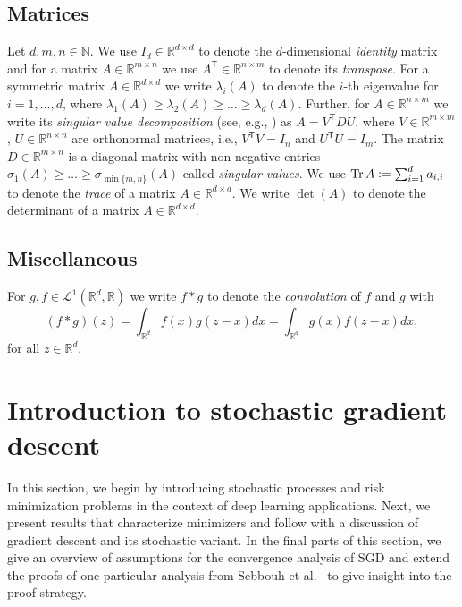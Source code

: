 \documentclass[12pt]{article}
\theoremstyle{definition}
\numberwithin{equation}{section}
\newcommand{\N}{\mathbb{N}}
\newcommand{\R}{\mathbb{R}}
\newcommand{\CL}{\mathcal{L}}
\newcommand{\T}{\mathsf{T}}
\newcommand{\defeq}{\vcentcolon=}
\DeclareMathOperator{\Tr}{Tr}
\begin{document}
\subsection{Matrices}
Let $d,m,n \in \N$. We use $I_d \in \R^{d \times d}$ to denote the $d$-dimensional \emph{identity} matrix and for a matrix $A \in \R^{m \times n}$ we use $A^\T \in \R^{n \times m}$ to denote its \emph{transpose}.
For a symmetric matrix $A \in \R^{d \times d}$ we write $\lambda_i(A)$ to denote the $i$-th eigenvalue for $i=1,\dots,d$, where $\lambda_1(A) \geq \lambda_2(A) \geq \dots \geq \lambda_d(A)$. Further, for $A \in \R^{n \times m}$ we write its \emph{singular value decomposition} (see, e.g., \cite{lycheNumericalLinearAlgebra2020}) as $A = V^\T D U$, where $V \in \R^{m \times m}$, $U \in \R^{n \times n}$ are orthonormal matrices, i.e., $V^\T V = I_n$ and $U^\T U = I_m$. The matrix $D \in \R^{m \times n}$ is a diagonal matrix with non-negative entries $\sigma_1(A) \geq \dots \geq \sigma_{\min\{m,n\}}(A)$ called \emph{singular values}. We use $\Tr A \defeq \sum_{i=1}^d a_{i,i}$ to denote the \emph{trace} of a matrix $A \in \R^{d \times d}$. We write $\det(A)$ to denote the determinant of a matrix $A \in \R^{d\times d}$.
\subsection{Miscellaneous}
For $g,f \in \CL^1(\R^d, \R)$ we write $f*g$ to denote the \emph{convolution} of $f$ and $g$ with 
\begin{equation*}
  (f*g)(z) = \int_{\R^d} f(x)g(z-x)dx = \int_{\R^d} g(x)f(z-x)dx,
\end{equation*}
for all $z \in \R^d$.
\section{Introduction to stochastic gradient descent}
\label{sec:stochastic_optimization}
In this section, we begin by introducing stochastic processes and risk minimization problems in the context of deep learning applications. Next, we present results that characterize minimizers and follow with a discussion of gradient descent and its stochastic variant. In the final parts of this section, we give an overview of assumptions for the convergence analysis of SGD and extend the proofs of one particular analysis from Sebbouh et al.\ \cite{sebbouhAlmostSureConvergence2021} to give insight into the proof strategy.
\end{document}
